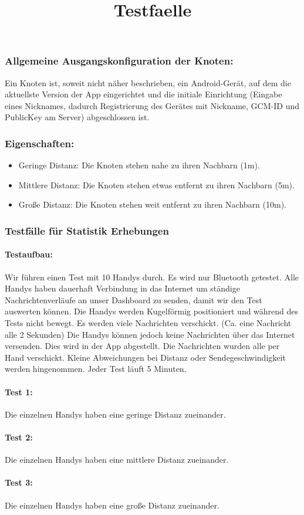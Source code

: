 \subsubsection{Allgemeine Ausgangskonfiguration der Knoten:}\label{Ausgangskonfiguration}

Ein Knoten ist, soweit nicht näher beschrieben, ein Android-Gerät, auf dem die aktuellste Version der App eingerichtet und die initiale Einrichtung (Eingabe eines Nicknames, dadurch Registrierung des Gerätes mit Nickname, GCM-ID und PublicKey am Server) abgeschlossen ist.

\subsubsection{Eigenschaften:}\label{Eigenschaften}

\begin{itemize}
\tightlist
\item
Geringe Distanz: Die Knoten stehen nahe zu ihren Nachbarn (1m).
\item
Mittlere Distanz: Die Knoten stehen etwas entfernt zu ihren Nachbarn (5m).
\item
Große Distanz: Die Knoten stehen weit entfernt zu ihren Nachbarn (10m).
\end{itemize}

\subsubsection{Testfälle für Statistik Erhebungen}\title{Testfaelle}

\paragraph*{Testaufbau:}
Wir führen einen Test mit 10 Handys durch. Es wird nur Bluetooth getestet. Alle Handys haben dauerhaft Verbindung in das Internet um ständige Nachrichtenverläufe an unser Dashboard zu senden, damit wir den Test auswerten können. Die Handys werden Kugelförmig positioniert und
während des Tests nicht bewegt. Es werden viele Nachrichten verschickt. (Ca. eine Nachricht alle 2 Sekunden) Die Handys können jedoch keine Nachrichten über das Internet versenden. Dies wird in der App abgestellt. Die Nachrichten wurden alle per Hand verschickt. Kleine Abweichungen bei Distanz oder Sendegeschwindigkeit werden hingenommen. Jeder Test läuft 5 Minuten. 
\paragraph*{Test 1:}
Die einzelnen Handys haben eine geringe Distanz zueinander. 
\paragraph*{Test 2:}
Die einzelnen Handys haben eine mittlere Distanz zueinander. 
\paragraph*{Test 3:}
Die einzelnen Handys haben eine große Distanz zueinander. 
